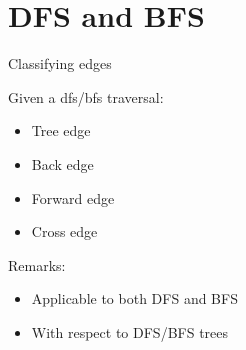 \section{DFS and BFS}

\begin{frame}{Classifying edges}
  \begin{definition}
    Given a dfs/bfs traversal:
    \begin{itemize}
      \item Tree edge
      \item Back edge
      \item Forward edge
      \item Cross edge
    \end{itemize}
  \end{definition}

  \begin{alertblock}{Remarks:}
    \begin{itemize}
      \item Applicable to both DFS and BFS
      \item With respect to DFS/BFS trees
    \end{itemize}
  \end{alertblock}
\end{frame}
